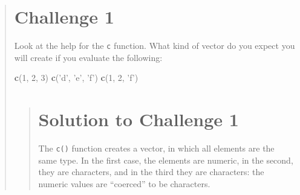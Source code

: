 \documentclass[]{book}
\newenvironment{Shaded}{\begin{snugshade}}{\end{snugshade}}
\newcommand{\KeywordTok}[1]{\textcolor[rgb]{0.13,0.29,0.53}{\textbf{#1}}}
\newcommand{\DecValTok}[1]{\textcolor[rgb]{0.00,0.00,0.81}{#1}}
\newcommand{\StringTok}[1]{\textcolor[rgb]{0.31,0.60,0.02}{#1}}
\newcommand{\NormalTok}[1]{#1}
\begin{document}
\begin{quote}
\section{Challenge 1}\label{challenge-1}

Look at the help for the \texttt{c} function. What kind of vector do you
expect you will create if you evaluate the following:

\begin{Shaded}
\begin{Highlighting}[]
\KeywordTok{c}\NormalTok{(}\DecValTok{1}\NormalTok{, }\DecValTok{2}\NormalTok{, }\DecValTok{3}\NormalTok{)}
\KeywordTok{c}\NormalTok{(}\StringTok{'d'}\NormalTok{, }\StringTok{'e'}\NormalTok{, }\StringTok{'f'}\NormalTok{)}
\KeywordTok{c}\NormalTok{(}\DecValTok{1}\NormalTok{, }\DecValTok{2}\NormalTok{, }\StringTok{'f'}\NormalTok{)}
\end{Highlighting}
\end{Shaded}

\begin{quote}
\section{Solution to Challenge 1}\label{solution-to-challenge-1}

The \texttt{c()} function creates a vector, in which all elements are
the same type. In the first case, the elements are numeric, in the
second, they are characters, and in the third they are characters: the
numeric values are ``coerced'' to be characters.
\end{quote}
\end{quote}
\end{document}
